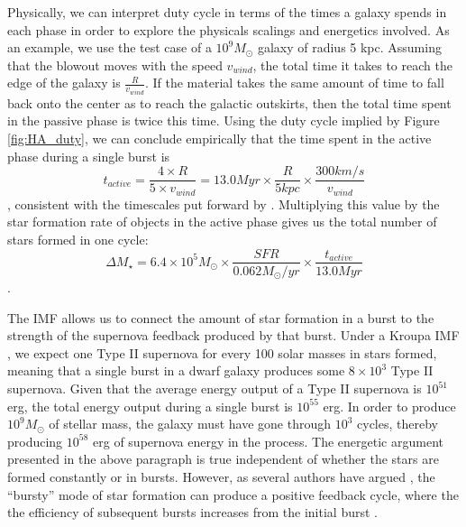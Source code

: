 \documentclass[iop]{emulateapj}
\begin{document}
Physically, we can interpret duty cycle in terms of the times a galaxy spends in each phase in order to explore the physicals scalings and energetics involved. As an example, we use the test case of a $10^9 M_{\odot}$ galaxy of radius 5 kpc. Assuming that the blowout moves with the speed $v_{wind}$, the total time it takes to reach the edge of the galaxy is $\frac{R}{v_{wind}}$. If the material takes the same amount of time to fall back onto the center as to reach the galactic outskirts, then the total time spent in the passive phase is twice this time. Using the duty cycle implied by Figure \ref{fig:HA_duty}, we can conclude empirically that the time spent in the active phase during a single burst is $$t_{active} = \frac{4 \times R}{5 \times v_{wind}} = 13.0 Myr \times \frac{R}{5 kpc}\times \frac{300 km/s}{v_{wind}}  $$, consistent with the timescales put forward by \cite{EB17}. Multiplying this value by the star formation rate of objects in the active phase gives us the total number of stars formed in one cycle:
$$\Delta M_{\star} = 6.4 \times 10^5 M_{\odot} \times \frac{SFR}{0.062 M_{\odot}/yr} \times \frac{t_{active}}{13.0 Myr}$$.

The IMF allows us to connect the amount of star formation in a burst to the strength of the supernova feedback produced by that burst. Under a Kroupa IMF \citep{Kroupa02}, we expect one Type II supernova for every 100 solar masses in stars formed, meaning that a single burst in a dwarf galaxy produces some $8 \times 10^3$ Type II supernova. Given that the average energy output of a Type II supernova is $10^{51}$ erg, the total energy output during a single burst is $10^{55}$ erg. In order to produce $10^9 M_{\odot}$ of stellar mass, the galaxy must have gone through $10^3$ cycles, thereby producing $10^{58}$ erg of supernova energy in the process. The energetic argument presented in the above paragraph is true independent of whether the stars are formed constantly or in bursts. However, as several authors have argued \citep{Governato12,GK13}, the ``bursty'' mode of star formation can produce a positive feedback cycle, where the the efficiency of subsequent bursts increases from the initial burst \cite[see][]{Pontzen12,Governato12}. 

\end{document}
